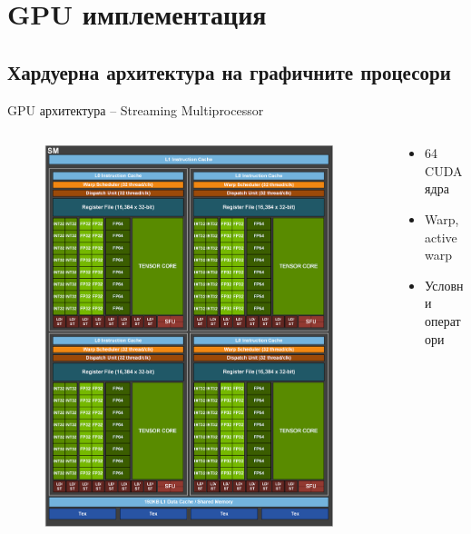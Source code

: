 \documentclass{beamer}
\begin{document}
\fi

\section{GPU имплементация}
\subsection{Хардуерна архитектура на графичните процесори}
\begin{frame}{GPU архитектура -- Streaming Multiprocessor}
\begin{columns} 
    \begin{column}{.5\textwidth}
        \begin{figure}[H]
  \centering
  \includegraphics[width=0.95\textwidth]{../Figures/presentation/sm.png}
\end{figure}
    \end{column}
    \begin{column}{.5\textwidth}
		\begin{itemize}
			\item 64 CUDA ядра
			\item Warp, active warp
			\item Условни оператори
		\end{itemize}
    \end{column}
\end{columns}
\end{frame}
\end{document}
